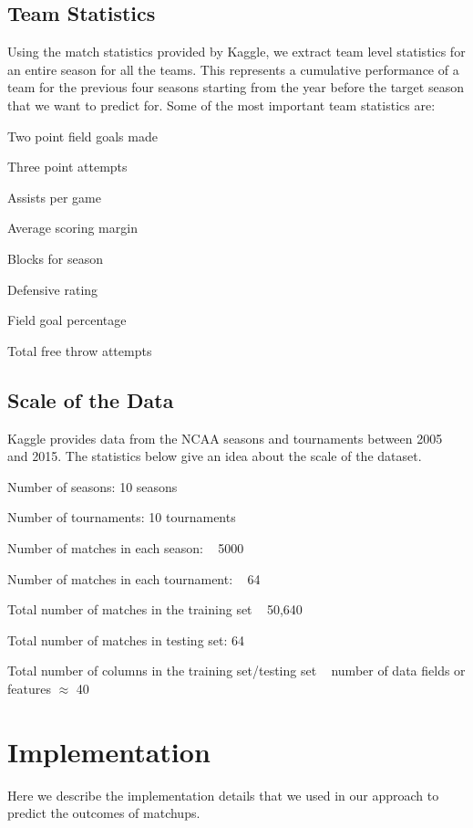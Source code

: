 \documentclass{article}
\begin{document}
    	\begin{multicols}{2} 
	
	\subsection{Team Statistics}
	Using the match statistics provided by Kaggle, we extract team level statistics for an entire season for all the teams. This represents a cumulative performance of a team for the previous four seasons starting from the year before the target season that we want to predict for. Some of the most important team statistics are:
	\begin{list}{•}
\item
	Two point field goals made 
\item
Three point attempts
\item
Assists per game
\item
Average scoring margin
\item
Blocks for season
\item
Defensive rating
\item
Field goal percentage
\item
Total free throw attempts
	\end{list}
	\subsection{Scale of the Data}
	Kaggle provides data from the NCAA seasons and tournaments between 2005 and 2015. The statistics below give an idea about the scale of the dataset.	
\begin{list}{•}
\item
Number of seasons: 10 seasons
\item
Number of tournaments: 10 tournaments
\item
Number of matches in each season: ~ 5000
\item
Number of matches in each tournament{\color{red}:} ~ 64
\item
Total number of matches in the training set ~ 50,640
\item
Total number of matches in testing set: 64
\item
Total number of columns in the training set/testing set ~ number of data fields or features $\approx$ 40
\end{list}

	\section{Implementation}
	Here we describe the implementation details that we used in our approach to predict the outcomes of matchups.


\end{multicols}
\end{document}
